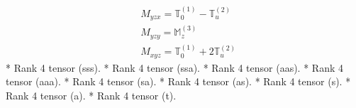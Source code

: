 \documentclass[fleqn,8pt,landscape]{jsarticle}
\begin{document}
\begin{align*}
& M_{yzx} = \mathbb{T}_{0}^{(1)} - \mathbb{T}_{u}^{(2)} \\
& M_{yzy} = \mathbb{M}_{z}^{(3)} \\
& M_{xyz} = \mathbb{T}_{0}^{(1)} + 2 \mathbb{T}_{u}^{(2)}
\end{align*}
* Rank 4 tensor (sss).
* Rank 4 tensor (ssa).
* Rank 4 tensor (aas).
* Rank 4 tensor (aaa).
* Rank 4 tensor (sa).
* Rank 4 tensor (as).
* Rank 4 tensor (s).
* Rank 4 tensor (a).
* Rank 4 tensor (t).
\end{document}
